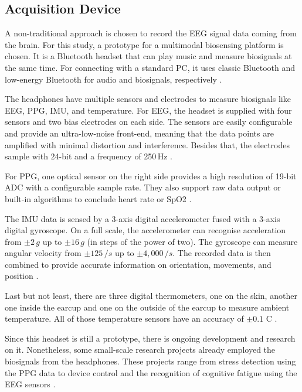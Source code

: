     \subsection{Acquisition Device}\label{section: headset}
    A non-traditional approach is chosen to record the \ac{EEG} signal data coming from the brain. For this study, a prototype for a multimodal biosensing platform is chosen. It is a Bluetooth headset that can play music and measure biosignals at the same time. For connecting with a standard PC, it uses classic Bluetooth and low-energy Bluetooth for audio and biosignals, respectively \cite{anonym2024presentation}. \par
    The headphones have multiple sensors and electrodes to measure biosignals like EEG, PPG, IMU, and temperature. For \ac{EEG}, the headset is supplied with four sensors and two bias electrodes on each side. The sensors are easily configurable and provide an ultra-low-noise front-end, meaning that the data points are amplified with minimal distortion and interference. Besides that, the electrodes sample with 24-bit and a frequency of 250\,Hz \cite{anonym2024presentation}. \par
    For \ac{PPG}, one optical sensor on the right side provides a high resolution of 19-bit \ac{ADC} with a configurable sample rate. They also support raw data output or built-in algorithms to conclude heart rate or SpO2 \cite{anonym2024presentation}.\par
    The \ac{IMU} data is sensed by a 3-axis digital accelerometer fused with a 3-axis digital gyroscope. On a full scale, the accelerometer can recognise acceleration from $\pm 2\,g $  up to $\pm 16\,g$ (in steps of the power of two). The gyroscope can measure angular velocity from $\pm 125$\,\textdegree$/s$ up to $\pm 4,000$\,\textdegree$/s$. The recorded data is then combined to provide accurate information on orientation, movements, and position \cite{anonym2024presentation}.\par
    Last but not least, there are three digital thermometers, one on the skin, another one inside the earcup and one on the outside of the earcup to measure ambient temperature. All of those temperature sensors have an accuracy of $\pm 0.1$\,\textdegree\,C \cite{anonym2024presentation}. \par
    Since this headset is still a prototype, there is ongoing development and research on it. Nonetheless, some small-scale research projects already employed the biosignals from the headphones. These projects range from stress detection using the \ac{PPG} data to device control and the recognition of cognitive fatigue using the \ac{EEG} sensors \cite{anonym2024presentation}. \par


